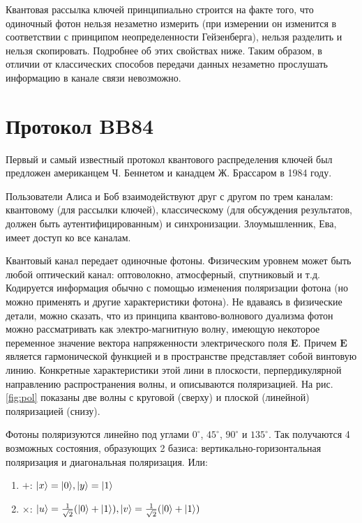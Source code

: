 \documentclass[a4paper,14pt]{extarticle}
\DeclarePairedDelimiter\ket{\lvert}{\rangle}
\newcommand{\Vec}[1]{\mathbf{#1}}
\begin{document}
Квантовая рассылка ключей принципиально строится на факте того, что одиночный
фотон нельзя незаметно измерить (при измерении он изменится в соответствии с
принципом неопределенности Гейзенберга), нельзя разделить и нельзя скопировать.
Подробнее об этих свойствах ниже. Таким образом, в отличии от классических
способов передачи данных незаметно прослушать информацию в канале связи
невозможно. 

\section{Протокол BB84}

Первый и самый известный протокол квантового распределения ключей был предложен
американцем Ч. Беннетом и канадцем Ж. Брассаром в 1984 году.

Пользователи Алиса и Боб взаимодействуют друг с другом по трем каналам:
квантовому (для рассылки ключей), классическому (для обсуждения результатов,
должен быть аутентифицированным) и синхронизации. Злоумышленник, Ева, имеет
доступ ко все каналам.

Квантовый канал передает одиночные фотоны. Физическим уровнем может быть любой
оптический канал: оптоволокно, атмосферный, спутниковый и т.д. Кодируется
информация обычно с помощью изменения поляризации фотона (но можно применять и
другие характеристики фотона). Не вдаваясь в физические детали, можно сказать,
что из принципа квантово-волнового дуализма фотон можно рассматривать как
электро-магнитную волну, имеющую некоторое переменное значение вектора
напряженности электрического поля $\Vec{E}$. Причем $\Vec{E}$ является
гармонической функцией и в пространстве представляет собой винтовую линию.
Конкретные характеристики этой лини в плоскости, перпердикулярной направлению
распространения волны, и описываются поляризацией. На рис. \ref{fig:pol}
показаны две волны с круговой (сверху) и плоской (линейной) поляризацией
(снизу).

Фотоны поляризуются линейно под углами $0^\circ$, $45^\circ$, $90^\circ$ и
$135^\circ$. Так получаются 4 возможных состояния, образующих 2 базиса:
вертикально-горизонтальная поляризация и диагональная поляризация. Или:
\begin{enumerate}
    \item $+$: $\ket{x} = \ket{0}, \ket{y} = \ket{1}$
    \item $\times$: $\ket{u} = \frac{1}{\sqrt{2}}(\ket{0} + \ket{1}), \ket{v}
        = \frac{1}{\sqrt{2}}(\ket{0} + \ket{1})$
\end{enumerate}
\end{document}
